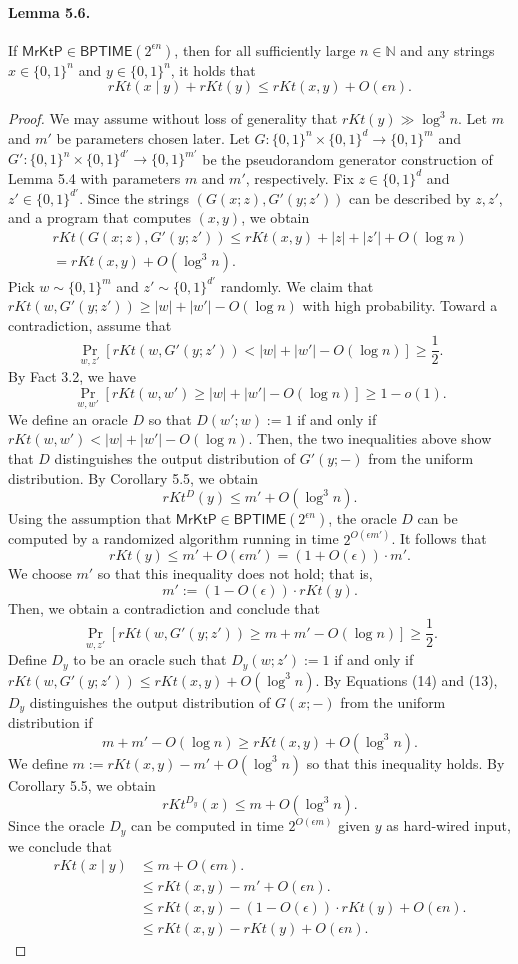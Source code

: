 \documentclass[10pt,a4paper]{article}
\begin{document}
\paragraph{Lemma 5.6.}
If $\mathsf{MrKtP}\in\mathsf{BPTIME}(2^{\epsilon n})$, then for all sufficiently large $n\in\mathbb N$ and any strings $x\in\{0,1\}^n$ and $y\in\{0,1\}^n$, it holds that
\[rKt(x\mid y)+rKt(y)\leq rKt(x,y)+O(\epsilon n).\]
\begin{proof}
We may assume without loss of generality that $rKt(y)\gg\log^3 n$. Let $m$ and $m'$ be parameters chosen later. Let $G:\{0,1\}^n\times\{0,1\}^d\to\{0,1\}^m$ and $G':\{0,1\}^n\times\{0,1\}^{d'}\to\{0,1\}^{m'}$ be the pseudorandom generator construction of Lemma 5.4 with parameters $m$ and $m'$, respectively.
Fix $z\in\{0,1\}^d$ and $z'\in\{0,1\}^{d'}$. Since the strings $(G(x;z),G'(y;z'))$ can be described by $z,z'$, and a program that computes $(x,y)$, we obtain
\begin{multline*}
rKt(G(x;z),G'(y;z'))\leq rKt(x,y)+|z|+|z'|+O(\log n)\\
=rKt(x,y)+O(\log^3 n).\tag{13}
\end{multline*}
Pick $w\sim\{0,1\}^m$ and $z'\sim\{0,1\}^{d'}$ randomly. We claim that $rKt(w,G'(y;z'))\geq|w|+|w'|-O(\log n)$ with high probability. Toward a contradiction, assume that
\[\Pr_{w,z'}[rKt(w,G'(y;z'))<|w|+|w'|-O(\log n)]\geq\frac12.\]
By Fact 3.2, we have
\[\Pr_{w,w'}[rKt(w,w')\geq|w|+|w'|-O(\log n)]\geq1-o(1).\]
We define an oracle $D$ so that $D(w';w):=1$ if and only if $rKt(w,w')<|w|+|w'|-O(\log n)$. Then, the two inequalities above show that $D$ distinguishes the output distribution of $G'(y;-)$ from the uniform distribution. By Corollary 5.5, we obtain
\[rKt^D(y)\leq m'+O(\log^3 n).\]
Using the assumption that $\mathsf{MrKtP}\in\mathsf{BPTIME}(2^{\epsilon n})$, the oracle $D$ can be computed by a randomized algorithm running in time $2^{O(\epsilon m')}$. It follows that
\[rKt(y)\leq m'+O(\epsilon m')=(1+O(\epsilon))\cdot m'.\]
We choose $m'$ so that this inequality does not hold; that is,
\[m':=(1-O(\epsilon))\cdot rKt(y).\]
Then, we obtain a contradiction and conclude that
\[\Pr_{w,z'}[rKt(w,G'(y;z'))\geq m+m'-O(\log n)]\geq\frac12.\tag{14}\]
Define $D_y$ to be an oracle such that $D_y(w;z'):=1$ if and only if $rKt(w,G'(y;z'))\leq rKt(x,y)+O(\log^3n)$. By Equations (14) and (13), $D_y$ distinguishes the output distribution of $G(x;-)$ from the uniform distribution if
\[m+m'-O(\log n)\geq rKt(x,y)+O(\log^3 n).\]
We define $m:=rKt(x,y)-m'+O(\log^3n)$ so that this inequality holds. By Corollary 5.5, we obtain
\[rKt^{D_y}(x)\leq m+O(\log^3n).\]
Since the oracle $D_y$ can be computed in time $2^{O(\epsilon m)}$ given $y$ as hard-wired input, we conclude that
\begin{align*}
rKt(x\mid y)&\leq m+O(\epsilon m).\\
&\leq rKt(x,y)-m'+O(\epsilon n).\\
&\leq rKt(x,y)-(1-O(\epsilon))\cdot rKt(y)+O(\epsilon n).\\
&\leq rKt(x,y)-rKt(y)+O(\epsilon n).
\end{align*}
\end{proof}
\end{document}
